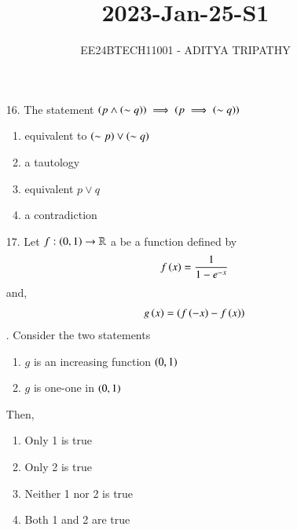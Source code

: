 \documentclass[journal,12pt,onecolumn]{IEEEtran}
\theoremstyle{remark}
\begin{document}

\vspace{3cm}

\title{2023-Jan-25-S1}
\author{EE24BTECH11001 -  ADITYA TRIPATHY}
\maketitle

\renewcommand{\thefigure}{\theenumi}
\renewcommand{\thetable}{\theenumi}

\begin{enumerate}
    \item[16.] 
        The statement $\left(p \land \left(\sim q\right)\right) \implies \left(p \implies \left(\sim q\right)\right)$
        \hfill{}
        \begin{multicols}{4}
            \begin{enumerate}
                \item equivalent to $\left(\sim p\right) \lor \left(\sim q\right)$
                    \columnbreak
                \item a tautology
                    \columnbreak
                \item equivalent $p \lor q$
                    \columnbreak
                \item a contradiction
            \end{enumerate}
        \end{multicols}

    \item[17.] Let $f : \left(0, 1\right) \rightarrow \mathbb{R}$ a be a function defined by
        \begin{align}
            f\left(x\right) = \frac{1}{1 - e^{-x}}
        \end{align} and, 
        \begin{align}
            g\left(x\right) = \left(f\left(-x\right) - f\left(x\right)\right)
        \end{align}. Consider the two statements
        \begin{enumerate}
            \item $g$ is an increasing function $\left(0, 1\right)$
            \item $g$ is one-one in $\left(0, 1\right)$
        \end{enumerate} Then,
        \hfill{}
        \begin{multicols}{4}
            \begin{enumerate}
                \item Only 1 is true \columnbreak
                \item Only 2 is true \columnbreak
                \item Neither 1 nor 2 is true \columnbreak
                \item Both 1 and 2 are true
            \end{enumerate}
        \end{multicols}



\end{enumerate}
\end{document}
